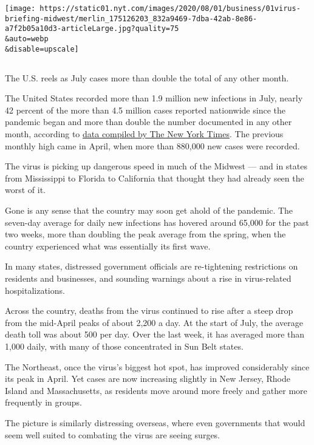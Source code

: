 \texttt{[image: https://static01.nyt.com/images/2020/08/01/business/01virus-briefing-midwest/merlin\_175126203\_832a9469-7dba-42ab-8e86-a7f2b05a10d3-articleLarge.jpg?quality=75\\\&auto=webp\\\&disable=upscale]}

\subsection{}

The U.S. reels as July cases more than double the total of any other
month.

The United States recorded more than 1.9 million new infections in July,
nearly 42 percent of the more than 4.5 million cases reported nationwide
since the pandemic began and more than double the number documented in
any other month, according to
\href{https://www.nytimes.com/interactive/2020/us/coronavirus-us-cases.html?action=click\&module=Top\%20Stories\&pgtype=Homepage\#map}{data
compiled by The New York Times}. The previous monthly high came in
April, when more than 880,000 new cases were recorded.

The virus is picking up dangerous speed in much of the Midwest --- and
in states from Mississippi to Florida to California that thought they
had already seen the worst of it.

Gone is any sense that the country may soon get ahold of the pandemic.
The seven-day average for daily new infections has hovered around 65,000
for the past two weeks, more than doubling the peak average from the
spring, when the country experienced what was essentially its first
wave.

In many states, distressed government officials are re-tightening
restrictions on residents and businesses, and sounding warnings about a
rise in virus-related hospitalizations.

Across the country, deaths from the virus continued to rise after a
steep drop from the mid-April peaks of about 2,200 a day. At the start
of July, the average death toll was about 500 per day. Over the last
week, it has averaged more than 1,000 daily, with many of those
concentrated in Sun Belt states.

The Northeast, once the virus's biggest hot spot, has improved
considerably since its peak in April. Yet cases are now increasing
slightly in New Jersey, Rhode Island and Massachusetts, as residents
move around more freely and gather more frequently in groups.

The picture is similarly distressing overseas, where even governments
that would seem well suited to combating the virus are seeing surges.

